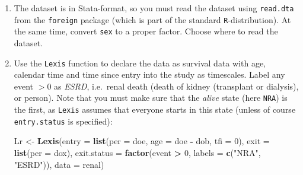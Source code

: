 \documentclass[
]{book}
\newenvironment{Shaded}{\begin{snugshade}}{\end{snugshade}}
\newcommand{\AttributeTok}[1]{\textcolor[rgb]{0.13,0.29,0.53}{#1}}
\newcommand{\CommentTok}[1]{\textcolor[rgb]{0.56,0.35,0.01}{\textit{#1}}}
\newcommand{\DecValTok}[1]{\textcolor[rgb]{0.00,0.00,0.81}{#1}}
\newcommand{\FunctionTok}[1]{\textcolor[rgb]{0.13,0.29,0.53}{\textbf{#1}}}
\newcommand{\NormalTok}[1]{#1}
\newcommand{\OtherTok}[1]{\textcolor[rgb]{0.56,0.35,0.01}{#1}}
\newcommand{\SpecialCharTok}[1]{\textcolor[rgb]{0.81,0.36,0.00}{\textbf{#1}}}
\newcommand{\StringTok}[1]{\textcolor[rgb]{0.31,0.60,0.02}{#1}}
\begin{document}
\begin{enumerate}
\def\labelenumi{\arabic{enumi}.}
\item
  The dataset is in Stata-format, so you must read the dataset
  using \texttt{read.dta} from the \texttt{foreign} package (which is
  part of the standard \texttt{R}-distribution). At the same time, convert
  \texttt{sex} to a proper factor. Choose where to read the dataset.

\begin{Shaded}
\end{Shaded}
\item
  Use the \texttt{Lexis} function to declare the data as
  survival data with age, calendar time and time since entry into
  the study as timescales. Label any event \(>0\) as \emph{ESRD},
  i.e.~renal death (death of kidney (transplant or dialysis), or
  person).
  Note that you must make sure that the \emph{alive} state (here
  \texttt{NRA}) is the first, as \texttt{Lexis} assumes that
  everyone starts in this state (unless of course
  \texttt{entry.status} is specified):

\begin{Shaded}
\begin{Highlighting}[]
\NormalTok{Lr }\OtherTok{\textless{}{-}} \FunctionTok{Lexis}\NormalTok{(}\AttributeTok{entry =} \FunctionTok{list}\NormalTok{(}\AttributeTok{per =}\NormalTok{ doe,}
                         \AttributeTok{age =}\NormalTok{ doe }\SpecialCharTok{{-}}\NormalTok{ dob,}
                         \AttributeTok{tfi =} \DecValTok{0}\NormalTok{),}
             \AttributeTok{exit =} \FunctionTok{list}\NormalTok{(}\AttributeTok{per =}\NormalTok{ dox),}
      \AttributeTok{exit.status =} \FunctionTok{factor}\NormalTok{(event }\SpecialCharTok{\textgreater{}} \DecValTok{0}\NormalTok{, }\AttributeTok{labels =} \FunctionTok{c}\NormalTok{(}\StringTok{"NRA"}\NormalTok{, }\StringTok{"ESRD"}\NormalTok{)),}
             \AttributeTok{data =}\NormalTok{ renal)}
\end{Highlighting}
\end{Shaded}


\end{enumerate}
\end{document}
